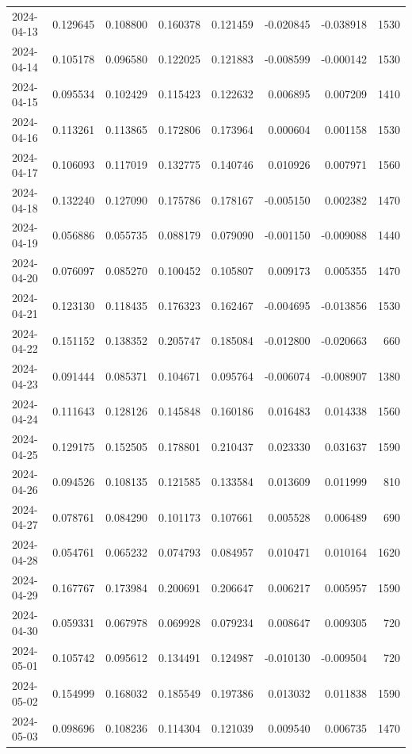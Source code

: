 \begin{tabular}{lrrrrrrr}
2024-04-13 & 0.129645 & 0.108800 & 0.160378 & 0.121459 & -0.020845 & -0.038918 & 1530 \\
2024-04-14 & 0.105178 & 0.096580 & 0.122025 & 0.121883 & -0.008599 & -0.000142 & 1530 \\
2024-04-15 & 0.095534 & 0.102429 & 0.115423 & 0.122632 & 0.006895 & 0.007209 & 1410 \\
2024-04-16 & 0.113261 & 0.113865 & 0.172806 & 0.173964 & 0.000604 & 0.001158 & 1530 \\
2024-04-17 & 0.106093 & 0.117019 & 0.132775 & 0.140746 & 0.010926 & 0.007971 & 1560 \\
2024-04-18 & 0.132240 & 0.127090 & 0.175786 & 0.178167 & -0.005150 & 0.002382 & 1470 \\
2024-04-19 & 0.056886 & 0.055735 & 0.088179 & 0.079090 & -0.001150 & -0.009088 & 1440 \\
2024-04-20 & 0.076097 & 0.085270 & 0.100452 & 0.105807 & 0.009173 & 0.005355 & 1470 \\
2024-04-21 & 0.123130 & 0.118435 & 0.176323 & 0.162467 & -0.004695 & -0.013856 & 1530 \\
2024-04-22 & 0.151152 & 0.138352 & 0.205747 & 0.185084 & -0.012800 & -0.020663 & 660 \\
2024-04-23 & 0.091444 & 0.085371 & 0.104671 & 0.095764 & -0.006074 & -0.008907 & 1380 \\
2024-04-24 & 0.111643 & 0.128126 & 0.145848 & 0.160186 & 0.016483 & 0.014338 & 1560 \\
2024-04-25 & 0.129175 & 0.152505 & 0.178801 & 0.210437 & 0.023330 & 0.031637 & 1590 \\
2024-04-26 & 0.094526 & 0.108135 & 0.121585 & 0.133584 & 0.013609 & 0.011999 & 810 \\
2024-04-27 & 0.078761 & 0.084290 & 0.101173 & 0.107661 & 0.005528 & 0.006489 & 690 \\
2024-04-28 & 0.054761 & 0.065232 & 0.074793 & 0.084957 & 0.010471 & 0.010164 & 1620 \\
2024-04-29 & 0.167767 & 0.173984 & 0.200691 & 0.206647 & 0.006217 & 0.005957 & 1590 \\
2024-04-30 & 0.059331 & 0.067978 & 0.069928 & 0.079234 & 0.008647 & 0.009305 & 720 \\
2024-05-01 & 0.105742 & 0.095612 & 0.134491 & 0.124987 & -0.010130 & -0.009504 & 720 \\
2024-05-02 & 0.154999 & 0.168032 & 0.185549 & 0.197386 & 0.013032 & 0.011838 & 1590 \\
2024-05-03 & 0.098696 & 0.108236 & 0.114304 & 0.121039 & 0.009540 & 0.006735 & 1470 \\

\end{tabular}
